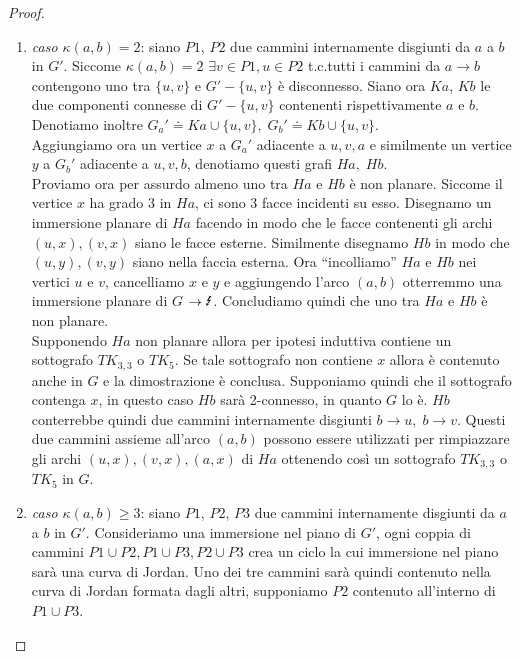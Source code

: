 \begin{teorema}
\begin{proof}
\begin{enumerate}
            \item \textit{caso \(\kappa(a,b)=2\)}: siano \(P1\), \(P2\) due cammini internamente disgiunti da \(a\) a \(b\) in \(G'\). Siccome \(\kappa(a,b)=2\) \(\exists v \in P1, u \in P2\) t.c.\@ tutti i cammini da \(a \to b\) contengono uno tra
            \(\{ u,v \} \) e \(G'-\{ u,v \} \) è disconnesso. Siano ora \(Ka\), \(Kb\) le due componenti connesse di \(G'-\{ u,v\} \) 
            contenenti rispettivamente \(a\) e \(b\). Denotiamo inoltre \(G_a' \doteq Ka \cup \{ u,v \},\; G_b' \doteq Kb \cup \{ u,v\} \).
            \\ Aggiungiamo ora un vertice \(x\) a \(G_a'\) adiacente a \(u,v,a\) e similmente un vertice \(y\) a \(G_b'\) adiacente a \(u,v,b\), denotiamo questi grafi \(Ha,\; Hb\). 
            \\ Proviamo ora per assurdo almeno uno tra \(Ha\) e \(Hb\) è non planare. Siccome il vertice \(x\) ha grado 3 in \(Ha\), ci sono 3 facce incidenti su esso. Disegnamo un immersione planare di \(Ha\) facendo in modo che le facce contenenti gli archi \((u,x), (v,x)\) siano le facce esterne. Similmente disegnamo \(Hb\) in modo che \((u,y),(v,y)\) siano nella faccia esterna. Ora “incolliamo” \(Ha\) e \(Hb\) nei vertici \(u\) e \(v\), cancelliamo \(x\) e \(y\) e aggiungendo l'arco \((a,b)\)
            otterremmo una immersione planare di \(G\) \(\rightarrow \text{\Lightning}\). Concludiamo quindi che uno tra \(Ha\) e \(Hb\) è non planare.\\
            Supponendo \(Ha\) non planare allora per ipotesi induttiva contiene un sottografo \(TK_{3,3}\) o \(TK_5\). Se tale sottografo non contiene \(x\) allora è contenuto anche in \(G\) e la dimostrazione è conclusa. Supponiamo quindi che il sottografo contenga \(x\), in questo caso \(Hb\) sarà 2-connesso, in quanto \(G\) lo è. \(Hb\) conterrebbe quindi due cammini internamente disgiunti \(b \to u,\; b\to v\). 
            Questi due cammini assieme all'arco \((a,b)\) possono essere utilizzati per rimpiazzare gli archi \((u,x),(v,x),(a,x)\) di \(Ha\) ottenendo così un sottografo \(TK_{3,3}\) o \(TK_5\) in \(G\).
            \item \textit{caso \(\kappa(a,b)\geq 3\)}: siano \(P1\), \(P2\), \(P3\) due cammini internamente disgiunti da \(a\) a \(b\) in \(G'\). Consideriamo una immersione nel piano di \(G'\), ogni coppia di cammini \(P1 \cup P2, P1 \cup P3, P2 \cup P3\) crea un ciclo la cui immersione nel piano sarà una curva di Jordan. Uno dei tre cammini sarà quindi contenuto nella curva di Jordan formata dagli altri, supponiamo \(P2\) contenuto all'interno di \(P1 \cup P3\).

\end{enumerate}
\end{proof}
\end{teorema}
